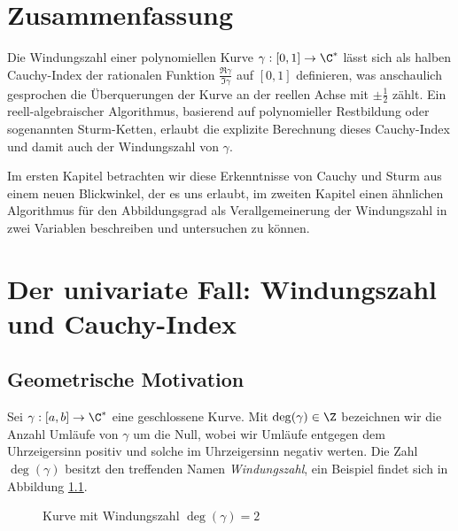 \documentclass{mythesis}
\begin{document}
\chapter*{Zusammenfassung}

Die Windungszahl einer polynomiellen Kurve $\gamma: [0, 1] \to \C^*$ lässt sich als halben Cauchy-Index der rationalen Funktion $\frac{\Re \gamma}{\Im \gamma}$ auf $[0,1]$ definieren, was anschaulich gesprochen die Überquerungen der Kurve an der reellen Achse mit $\pm \frac{1}{2}$ zählt.
Ein reell-algebraischer Algorithmus, basierend auf polynomieller Restbildung oder sogenannten Sturm-Ketten, erlaubt die explizite Berechnung dieses Cauchy-Index und damit auch der Windungszahl von $\gamma$.

Im ersten Kapitel betrachten wir diese Erkenntnisse von Cauchy und Sturm aus einem neuen Blickwinkel, der es uns erlaubt, im zweiten Kapitel einen ähnlichen Algorithmus für den Abbildungsgrad als Verallgemeinerung der Windungszahl in zwei Variablen beschreiben und untersuchen zu können.


{
    \let\clearpage\relax
    \tableofcontents
}


\chapter{Der univariate Fall: Windungszahl und Cauchy-Index} \label{sec:1}

\section{Geometrische Motivation}

Sei $\gamma: [a,b] \to \C^*$ eine geschlossene Kurve.
Mit $\deg(\gamma) \in \Z$ bezeichnen wir die Anzahl Umläufe von $\gamma$ um die Null, wobei wir Umläufe entgegen dem Uhrzeigersinn positiv und solche im Uhrzeigersinn negativ werten.
Die Zahl $\deg(\gamma)$ besitzt den treffenden Namen \emph{Windungszahl}, ein Beispiel findet sich in Abbildung \ref{fig:winding_number}.

\begin{figure}[ht]
    \centering
    \caption{Kurve mit Windungszahl $\deg(\gamma) = 2$}
    \label{fig:winding_number}
\end{figure}
\end{document}

